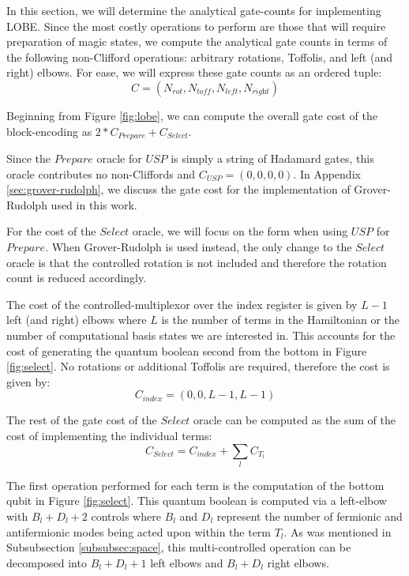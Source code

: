 In this section, we will determine the analytical gate-counts for implementing LOBE.
Since the most costly operations to perform are those that will require preparation of magic states, we compute the analytical gate counts in terms of the following non-Clifford operations: arbitrary rotations, Toffolis, and left (and right) elbows.
For ease, we will express these gate counts as an ordered tuple:
\begin{equation}
    \label{count gates not.}
    C = (N_{\textit{rot}}, N_{\textit{toff}}, N_{\textit{left}}, N_{\textit{right}})
\end{equation}

Beginning from Figure \ref{fig:lobe}, we can compute the overall gate cost of the block-encoding as $2*C_{\textit{Prepare}} + C_{\textit{Select}}$.

Since the $\textit{Prepare}$ oracle for $USP$ is simply a string of Hadamard gates, this oracle contributes no non-Cliffords and $C_{\textit{USP}} = (0, 0, 0, 0)$.
In Appendix \ref{sec:grover-rudolph}, we discuss the gate cost for the implementation of Grover-Rudolph used in this work. 

For the cost of the $\textit{Select}$ oracle, we will focus on the form when using $USP$ for $\textit{Prepare}$.
When Grover-Rudolph is used instead, the only change to the $\textit{Select}$ oracle is that the controlled rotation is not included and therefore the rotation count is reduced accordingly.  

The cost of the controlled-multiplexor over the index register is given by $L - 1$ left (and right) elbows \cite{babbush2018encoding} where $L$ is the number of terms in the Hamiltonian or the number of computational basis states we are interested in.
This accounts for the cost of generating the quantum boolean second from the bottom in Figure \ref{fig:select}.
No rotations or additional Toffolis are required, therefore the cost is given by: 
\begin{equation}
    C_{\textit{index}} = (0, 0, L-1, L-1)
\end{equation}

The rest of the gate cost of the $\textit{Select}$ oracle can be computed as the sum of the cost of implementing the individual terms:
\begin{equation}
    C_{\textit{Select}} = C_{\textit{index}} + \sum_{l} C_{T_l}
\end{equation}

The first operation performed for each term is the computation of the bottom qubit in Figure \ref{fig:select}.
This quantum boolean is computed via a left-elbow with $B_l + D_l + 2$ controls where $B_l$ and $D_l$ represent the number of fermionic and antifermionic modes being acted upon within the term $T_l$.
As was mentioned in Subsubsection \ref{subsubsec:space}, this multi-controlled operation can be decomposed into $B_l + D_l + 1$ left elbows and $B_l + D_l$ right elbows.

